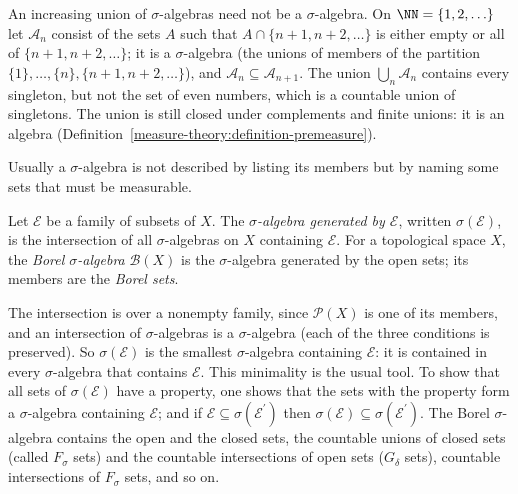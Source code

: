 \begin{counterexample}\label{measure-theory:counterexample-union-sigma-algebras}
An increasing union of $\sigma$-algebras need not be a $\sigma$-algebra. On $\NN = \{1, 2, \ldots\}$ let $\mathcal{A}_n$ consist of the sets $A$ such that $A \cap \{n + 1, n + 2, \ldots\}$ is either empty or
all of $\{n + 1, n + 2, \ldots\}$; it is a $\sigma$-algebra (the unions of members of the partition $\{1\}, \ldots, \{n\}, \{n + 1, n + 2, \ldots\}$), and $\mathcal{A}_n \subseteq \mathcal{A}_{n+1}$. The
union $\bigcup_n\mathcal{A}_n$ contains every singleton, but not the set of even numbers, which is a countable union of singletons. The union is still closed under complements and finite unions: it is an
algebra (Definition~\ref{measure-theory:definition-premeasure}).
\end{counterexample}

Usually a $\sigma$-algebra is not described by listing its members but by naming some sets that must be measurable.

\begin{definition}\label{measure-theory:definition-generated-sigma-algebra}
Let $\mathcal{E}$ be a family of subsets of $X$. The \emph{$\sigma$-algebra generated by $\mathcal{E}$}, written $\sigma(\mathcal{E})$, is the intersection of all $\sigma$-algebras on $X$ containing
$\mathcal{E}$. For a topological space $X$, the \emph{Borel $\sigma$-algebra} $\mathcal{B}(X)$ is the $\sigma$-algebra generated by the open sets; its members are the \emph{Borel sets}.
\end{definition}

The intersection is over a nonempty family, since $\mathcal{P}(X)$ is one of its members, and an intersection of $\sigma$-algebras is a $\sigma$-algebra (each of the three conditions is preserved). So
$\sigma(\mathcal{E})$ is the smallest $\sigma$-algebra containing $\mathcal{E}$: it is contained in every $\sigma$-algebra that contains $\mathcal{E}$. This minimality is the usual tool. To show that all
sets of $\sigma(\mathcal{E})$ have a property, one shows that the sets with the property form a $\sigma$-algebra containing $\mathcal{E}$; and if $\mathcal{E} \subseteq \sigma(\mathcal{E}^{\prime})$ then
$\sigma(\mathcal{E}) \subseteq \sigma(\mathcal{E}^{\prime})$. The Borel $\sigma$-algebra contains the open and the closed sets, the countable unions of closed sets (called $F_\sigma$ sets) and the countable
intersections of open sets ($G_\delta$ sets), countable intersections of $F_\sigma$ sets, and so on.

